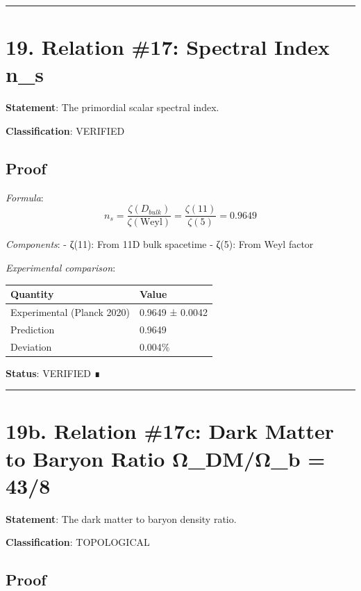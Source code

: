\documentclass[11pt,a4paper]{article}
\begin{document}
\begin{center}\rule{\linewidth}{0.5pt}\end{center}

\section{19. Relation \#17: Spectral Index n\_\allowbreak{}s}\label{relation-17-spectral-index-n_s}

\textbf{Statement}: The primordial scalar spectral index.

\textbf{Classification}: VERIFIED

\subsection{Proof}\label{proof-21}

\emph{Formula}: \[n_s = \frac{\zeta(D_{bulk})}{\zeta(\text{Weyl})} = \frac{\zeta(11)}{\zeta(5)} = 0.9649\]

\emph{Components}: - ζ(11): From 11D bulk spacetime - ζ(5): From Weyl factor

\emph{Experimental comparison}:

\begin{longtable}[]{@{}ll@{}}
\toprule\noalign{}
Quantity & Value \\
\midrule\noalign{}
\endhead
\bottomrule\noalign{}
\endlastfoot
Experimental (Planck 2020) & 0.9649 ± 0.0042 \\
Prediction & 0.9649 \\
Deviation & 0.004\% \\
\end{longtable}

\textbf{Status}: VERIFIED ∎

\begin{center}\rule{\linewidth}{0.5pt}\end{center}

\section{19b. Relation \#17c: Dark Matter to Baryon Ratio Ω\_\allowbreak{}DM/Ω\_\allowbreak{}b = 43/8}\label{b.-relation-17c-dark-matter-to-baryon-ratio-ux3c9_dmux3c9_b-438}

\textbf{Statement}: The dark matter to baryon density ratio.

\textbf{Classification}: TOPOLOGICAL

\subsection{Proof}\label{proof-22}
\end{document}
